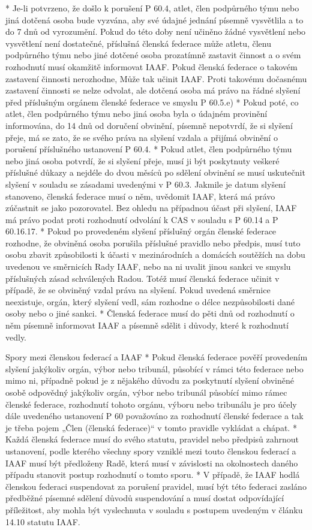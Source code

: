   * Je-li potvrzeno, že došlo k porušení P 60.4, atlet, člen podpůrného týmu nebo jiná dotčená osoba bude vyzvána, aby své údajné jednání písemně vysvětlila a to do 7 dnů od vyrozumění. Pokud do této doby není učiněno žádné vysvětlení nebo vysvětlení není dostatečné, příslušná členská federace může atletu, členu podpůrného týmu nebo jiné dotčené osoba prozatímně zastavit činnost a o svém rozhodnutí musí okamžitě informovat IAAF. Pokud členská federace o takovém zastavení činnosti nerozhodne, Může tak učinit IAAF. Proti takovému dočasnému zastavení činnosti se nelze odvolat, ale dotčená osoba má právo na řádné slyšení před příslušným orgánem členské federace ve smyslu P 60.5.e)
  * Pokud poté, co atlet, člen podpůrného týmu nebo jiná osoba byla o údajném provinění informována, do 14 dnů od doručení obvinění, písemně nepotvrdí, že si slyšení přeje, má se zato, že se svého práva na slyšení vzdala a přijímá obvinění o porušení příslušného ustanovení P 60.4.
  * Pokud atlet, člen podpůrného týmu nebo jiná osoba potvrdí, že si slyšení přeje, musí ji být poskytnuty veškeré příslušné důkazy a nejdéle do dvou měsíců po sdělení obvinění se musí uskutečnit slyšení v souladu se zásadami uvedenými v P 60.3. Jakmile je datum slyšení stanoveno, členská federace musí o něm, uvědomit IAAF, která má právo zúčastnit se jako pozorovatel. Bez ohledu na případnou účast při slyšení, IAAF má právo podat proti rozhodnutí odvolání k CAS v souladu s P 60.14 a P 60.16.17.
  * Pokud po provedeném slyšení příslušný orgán členské federace rozhodne, že obviněná osoba porušila příslušné pravidlo nebo předpis, musí tuto osobu zbavit způsobilosti k účasti v mezinárodních a domácích soutěžích na dobu uvedenou ve směrnicích Rady IAAF, nebo na ni uvalit jinou sankci ve smyslu příslušných zásad schválených Radou. Totéž musí členská federace učinit v případě, že se obviněný vzdal práva na slyšení. Pokud uvedená směrnice neexistuje, orgán, který slyšení vedl, sám rozhodne o délce nezpůsobilosti dané osoby nebo o jiné sankci.
  * Členská federace musí do pěti dnů od rozhodnutí o něm písemně informovat IAAF a písemně sdělit i důvody, které k rozhodnutí vedly.
  \enditems

Spory mezi členskou federací a IAAF
* Pokud členská federace pověří provedením slyšení jakýkoliv orgán, výbor nebo tribunál, působící v rámci této federace nebo mimo ni, případně pokud je z nějakého důvodu za poskytnutí slyšení obviněné osobě odpovědný jakýkoliv orgán, výbor nebo tribunál působící mimo rámec členské federace, rozhodnutí tohoto orgánu, výboru nebo tribunálu je pro účely dále uvedeného ustanovení P 60 považováno za rozhodnutí členské federace a tak je třeba pojem „Člen (členská federace)“ v tomto pravidle vykládat a chápat.
* Každá členská federace musí do svého statutu, pravidel nebo předpisů zahrnout ustanovení, podle kterého všechny spory vzniklé mezi touto členskou federací a IAAF musí být předloženy Radě, která musí v závislosti na okolnostech daného případu stanovit postup rozhodnutí o tomto sporu.
* V případě, že IAAF hodlá členskou federaci suspendovat za porušení pravidel, musí být této federaci zasláno předběžné písemné sdělení důvodů suspendování a musí dostat odpovídající příležitost, aby mohla být vyslechnuta v souladu s postupem uvedeným v článku 14.10 statutu IAAF.

